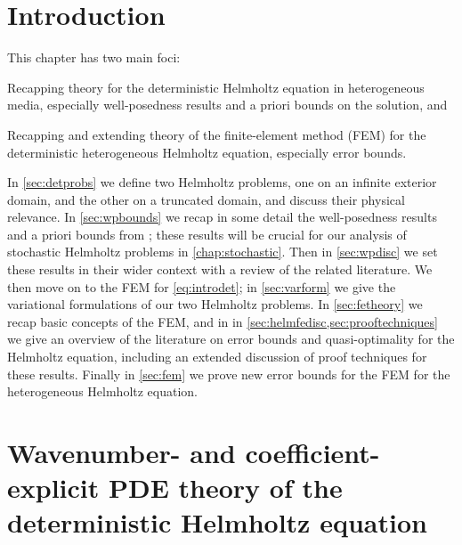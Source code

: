 \section{Introduction}
This chapter has two main foci:
\ben
\item Recapping theory for the deterministic Helmholtz equation in heterogeneous media, especially well-posedness results and a priori bounds on the solution, and
\item Recapping and extending theory of the finite-element method (FEM) for the deterministic heterogeneous Helmholtz equation, especially error bounds.
  \een


In \cref{sec:detprobs} we  define two Helmholtz problems, one on an infinite exterior domain, and the other on a truncated domain, and discuss their physical relevance. In \cref{sec:wpbounds} we  recap in some detail the well-posedness results and a priori bounds from \cite{GrPeSp:19}; these results will be crucial for our analysis of stochastic Helmholtz problems in \cref{chap:stochastic}. Then in \cref{sec:wpdisc} we set these results in their wider context with a review of the related literature. We  then move on to the FEM for \eqref{eq:introdet}; in \cref{sec:varform} we give the variational formulations of our two Helmholtz problems. In \cref{sec:fetheory} we recap basic concepts of the FEM, and in in \cref{sec:helmfedisc,sec:prooftechniques} we  give an overview of the literature on error bounds and quasi-optimality for the Helmholtz equation, including an extended discussion of proof techniques for these results. Finally in \cref{sec:fem} we  prove new error bounds for the FEM for the heterogeneous Helmholtz equation. 


\section{Wavenumber- and coefficient-explicit PDE theory of the deterministic Helmholtz equation}\label{sec:pdetheory}
  


